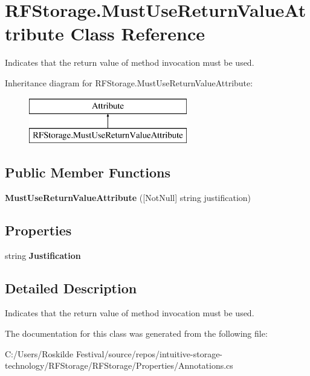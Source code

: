 \section{R\+F\+Storage.\+Must\+Use\+Return\+Value\+Attribute Class Reference}
\label{class_r_f_storage_1_1_must_use_return_value_attribute}


Indicates that the return value of method invocation must be used.  


Inheritance diagram for R\+F\+Storage.\+Must\+Use\+Return\+Value\+Attribute\+:\begin{figure}[H]
\begin{center}
\leavevmode
\includegraphics[height=2.000000cm]{class_r_f_storage_1_1_must_use_return_value_attribute}
\end{center}
\end{figure}
\subsection*{Public Member Functions}
\begin{DoxyCompactItemize}
\item 
\mbox{\label{class_r_f_storage_1_1_must_use_return_value_attribute_a9029626f9a494e853836049857d88175}} 
{\bfseries Must\+Use\+Return\+Value\+Attribute} ([Not\+Null] string justification)
\end{DoxyCompactItemize}
\subsection*{Properties}
\begin{DoxyCompactItemize}
\item 
\mbox{\label{class_r_f_storage_1_1_must_use_return_value_attribute_a6694d56cf5a8d15a8f40001812a09700}} 
string {\bfseries Justification}\hspace{0.3cm}{\ttfamily  [get]}
\end{DoxyCompactItemize}


\subsection{Detailed Description}
Indicates that the return value of method invocation must be used. 



The documentation for this class was generated from the following file\+:\begin{DoxyCompactItemize}
\item 
C\+:/\+Users/\+Roskilde Festival/source/repos/intuitive-\/storage-\/technology/\+R\+F\+Storage/\+R\+F\+Storage/\+Properties/Annotations.\+cs\end{DoxyCompactItemize}
